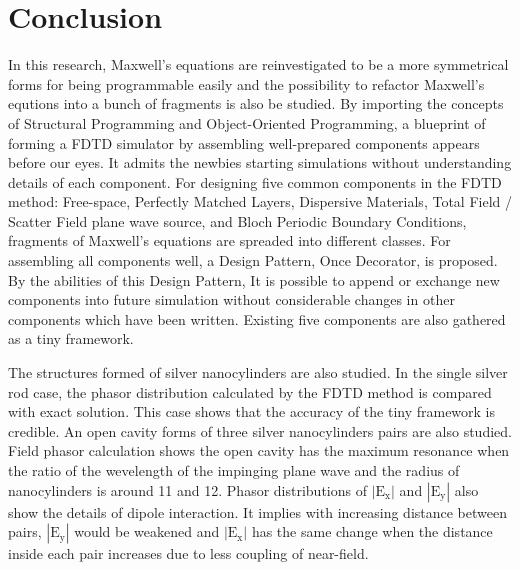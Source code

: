 \documentclass[openany]{book}
\begin{document}
\chapter{Conclusion}
In this research, Maxwell's equations are reinvestigated to be a more symmetrical forms for being programmable easily
and the possibility to refactor Maxwell's equtions into a bunch of fragments is also be studied. By importing the
concepts of Structural Programming and Object-Oriented Programming, a blueprint of forming a FDTD simulator by assembling
well-prepared components appears before our eyes. It admits the newbies starting simulations without understanding details
of each component. For designing five common components in the FDTD method: Free-space, Perfectly Matched Layers, Dispersive
Materials, Total Field / Scatter Field plane wave source, and Bloch Periodic Boundary Conditions, fragments of Maxwell's
equations are spreaded into different classes. For assembling all components well, a Design Pattern, Once Decorator, is
proposed. By the abilities of this Design Pattern, It is possible to append or exchange new components into future
simulation without considerable changes in other components which have been written. Existing five components are also gathered
as a tiny framework.

The structures formed of silver nanocylinders are also studied. In the single silver rod case, the phasor distribution
calculated by the FDTD method is compared with exact solution. This case shows that the accuracy of the tiny framework is
credible. An open cavity forms of three silver nanocylinders pairs are also studied. Field phasor calculation shows the open
cavity has the maximum resonance when the ratio of the wevelength of the impinging plane wave and the radius of nanocylinders is
around 11 and 12. Phasor distributions of $|\mathrm{E_x}|$ and $|\mathrm{E_y}|$ also show the details of
dipole interaction. It implies with increasing distance between pairs, $|\mathrm{E_y}|$ would be weakened and $|\mathrm{E_x}|$
has the same change when the distance inside each pair increases due to less coupling of near-field.






\backmatter

\end{document}
